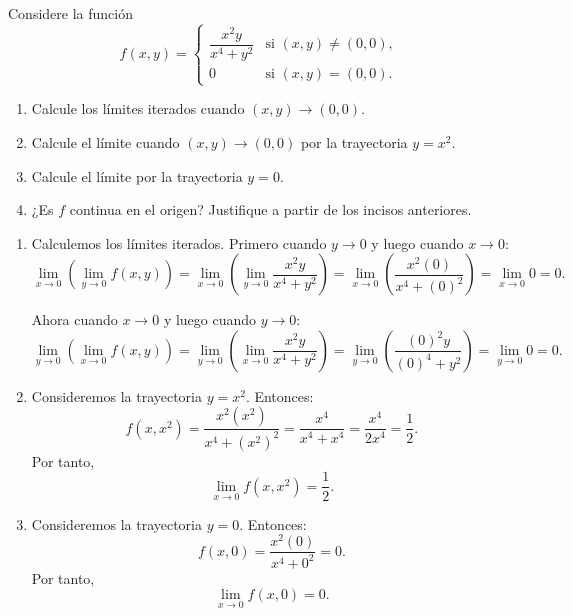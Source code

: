 \documentclass[11pt,respuestas,a4]{aleph-examen}
\begin{document}
\encabezado


\begin{preguntas}

\item
Considere la función
\[
    f(x,y) = \begin{cases}
        \dfrac{x^2 y}{x^4 + y^2} & \text{si } (x,y)\neq(0,0),\\[6pt]
        0 & \text{si } (x,y)=(0,0).
    \end{cases}
\]
\begin{enumerate}
    \item Calcule los límites iterados cuando $(x,y)\to(0,0)$.
    \item Calcule el límite cuando $(x,y)\to(0,0)$ por la trayectoria $y=x^2$.
    \item Calcule el límite por la trayectoria $y=0$.
    \item ¿Es $f$ continua en el origen? Justifique a partir de los incisos anteriores.
\end{enumerate}

\begin{respuesta}
\begin{enumerate}
    \item Calculemos los límites iterados. Primero cuando \(y\to0\) y luego cuando \(x\to0\):
    \[
        \lim_{x\to 0}\left(\lim_{y\to 0} f(x,y)\right)
        =
        \lim_{x\to 0}\left(\lim_{y\to 0} \frac{x^2y}{x^4+y^2}\right)
        =
        \lim_{x\to 0}\left(\frac{x^2(0)}{x^4+(0)^2}\right)
        =
        \lim_{x\to 0} 0
        =
        0.
    \]

    Ahora cuando \(x\to0\) y luego cuando \(y\to0\):
    \[
        \lim_{y\to 0}\left(\lim_{x\to 0} f(x,y)\right)
        =
        \lim_{y\to 0}\left(\lim_{x\to 0} \frac{x^2y}{x^4+y^2}\right)
        =
        \lim_{y\to 0}\left(\frac{(0)^2y}{(0)^4+y^2}\right)
        =
        \lim_{y\to 0} 0
        =
        0.
    \]

    \item Consideremos la trayectoria \(y=x^2\). Entonces:
    \[
        f(x,x^2)
        =
        \frac{x^2(x^2)}{x^4+(x^2)^2}
        =
        \frac{x^4}{x^4+x^4}
        =
        \frac{x^4}{2x^4}
        =
        \frac{1}{2}.
    \]
    Por tanto,
    \[
        \lim_{x\to 0} f(x,x^2)
        =
        \frac{1}{2}.
    \]

    \item Consideremos la trayectoria \(y=0\). Entonces:
    \[
        f(x,0)
        =
        \frac{x^2(0)}{x^4+0^2}
        =
        0.
    \]
    Por tanto,
    \[
        \lim_{x\to 0} f(x,0)
        =
        0.
    \]


\end{enumerate}
\end{respuesta}
\end{preguntas}
\end{document}
